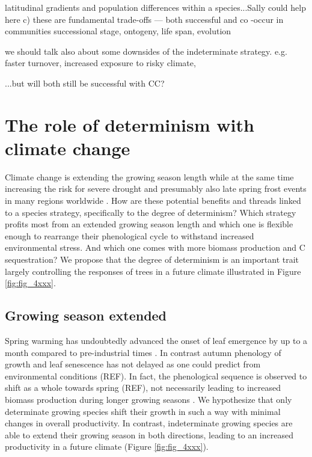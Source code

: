 \documentclass{article}
\begin{document}
latitudinal gradients and population differences within a species...Sally could help here
	c) these are fundamental trade-offs --- both successful and co -occur in communities
	successional stage, ontogeny, life span, evolution
	
	we should talk also about some downsides of the indeterminate strategy. e.g. faster turnover, increased exposure to risky climate, 
	
	...but will both still be successful with CC?
	
\section*{The role of determinism with climate change}
Climate change is extending the growing season length while at the same time increasing the risk for severe drought \citep{haoChangesSeverityCompound2018} and presumably also late spring frost events in many regions worldwide \citep{zohnerLatespringFrostRisk2020}. How are these potential benefits and threads linked to a species strategy, specifically to the degree of determinism? Which strategy profits most from an extended growing season length and which one is flexible enough to rearrange their phenological cycle to withstand increased environmental stress. And which one comes with more biomass production and C sequestration? We propose that the degree of determinism is an important trait largely controlling the responses of trees in a future climate illustrated in Figure \ref{fig:fig_4xxx}. 

			\subsection*{Growing season extended}
Spring warming has undoubtedly advanced the onset of leaf emergence by up to a month compared to pre-industrial times \citep{vitasseGreatAccelerationPlant2022b}. In contrast autumn phenology of growth and leaf senescence has not delayed as one could predict from environmental conditions (REF). In fact, the phenological sequence is observed to shift as a whole towards spring (REF), not necessarily leading to increased biomass production during longer growing seasons \citep{zaniIncreasedGrowingseasonProductivity2020b}. We hypothesize that only determinate growing species shift their growth in such a way with minimal changes in overall productivity. In contrast, indeterminate growing species are able to extend their growing season in both directions, leading to an increased productivity in a future climate (Figure \ref{fig:fig_4xxx}). 
\end{document}
